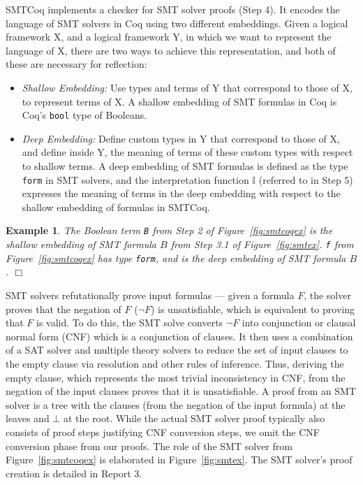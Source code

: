 \documentclass[11pt]{article}
\newtheorem{example}{Example}[section]
\begin{document}
	SMTCoq implements a checker for 
	SMT solver proofs (Step 4). It 
	encodes the language of SMT solvers
	in Coq using two different embeddings. 
	Given a logical framework X, and 
	a logical framework Y, in which we 
	want to represent the language of X, 
	there are two ways to achieve this
	representation, and 
	both of these are necessary for 
	reflection:
	\begin{itemize}
		\item \textit{Shallow Embedding: }
		Use types and terms of Y that 
		correspond to those of X, to 
		represent terms of X. A shallow
		embedding of SMT formulas in 
		Coq is Coq's \texttt{bool} 
		type of Booleans. 
		\item\textit{Deep Embedding: }
		Define custom types in Y that 
		correspond to those of X, and 
		define inside Y, the meaning of 
		terms of these custom types with 
		respect to shallow terms. A 
		deep embedding of SMT formulas 
		is defined as the type 
		\texttt{form} in SMT solvers, 
		and the interpretation function 
		$\mathbb{I}$ (referred to in 
		Step 5) expresses the meaning 
		of terms in the deep embedding 
		with respect to the shallow 
		embedding of formulas in SMTCoq.
	\end{itemize}
	
	\begin{example} 
		\em The Boolean 
		term \texttt{B} from Step 2 of 
		Figure~\ref{fig:smtcoqex}
		is the shallow embedding of SMT 
		formula $B$ from Step 3.1 of 
		Figure~\ref{fig:smtex}.
		\texttt{f} from 
		Figure~\ref{fig:smtcoqex} has
		type \texttt{form}, and is 
		the deep embedding of 
		SMT formula $B$. \hfill $\Box$
	\end{example}

	SMT solvers refutationally prove 
	input formulas --- given a formula
	$F$, the solver proves that the 
	negation of $F$ ($\neg F$) is 
	unsatisfiable, which is equivalent
	to proving that $F$ is valid. 
	To do this, the SMT solve converts 
	$\neg F$ into conjunction or clausal 
	normal form (CNF) which is a 
	conjunction of clauses. It then uses 
	a combination of a SAT solver and 
	multiple theory	solvers to reduce 
	the set of input clauses to the 
	empty clause via resolution
	and other rules of inference. Thus,
	deriving the empty clause, which 
	represents the most trivial
	inconsistency in CNF, from the 
	negation of the input clauses proves 
	that it is unsatisfiable. A proof
	from an SMT solver is a tree 
	with the clauses (from the 
	negation of the input formula) at
	the leaves and $\bot$
	at the root. While the actual SMT 
	solver proof typically also consists 
	of proof steps justifying CNF 
	conversion steps, we omit the 
	CNF conversion phase from our proofs.
	The role of the SMT
	solver from Figure~\ref{fig:smtcoqex}
	is elaborated in Figure~\ref{fig:smtex}.
	The SMT solver's proof creation is 
	detailed in Report 3.
	
\end{document}
